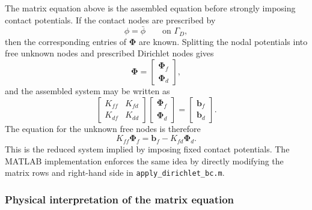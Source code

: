 \documentclass[11pt]{article}
\begin{document}
The matrix equation above is the assembled equation before strongly imposing contact potentials. If the contact nodes are prescribed by
\begin{equation}
\phi=\bar{\phi} \qquad \text{on } \Gamma_D,
\end{equation}
then the corresponding entries of $\bm{\Phi}$ are known. Splitting the nodal potentials into free unknown nodes and prescribed Dirichlet nodes gives
\begin{equation}
\bm{\Phi}
= \begin{bmatrix}
\bm{\Phi}_f \\
\bm{\Phi}_d
\end{bmatrix},
\end{equation}
and the assembled system may be written as
\begin{equation}
\begin{bmatrix}
K_{ff} & K_{fd} \\
K_{df} & K_{dd}
\end{bmatrix}
\begin{bmatrix}
\bm{\Phi}_f \\
\bm{\Phi}_d
\end{bmatrix}
=
\begin{bmatrix}
\bm{b}_f \\
\bm{b}_d
\end{bmatrix}.
\end{equation}
The equation for the unknown free nodes is therefore
\begin{equation}
\boxed{
K_{ff}\bm{\Phi}_f
= \bm{b}_f - K_{fd}\bm{\Phi}_d .
}
\label{eq:module2_dirichlet_reduced_system}
\end{equation}
This is the reduced system implied by imposing fixed contact potentials. The MATLAB implementation enforces the same idea by directly modifying the matrix rows and right-hand side in \texttt{apply\_dirichlet\_bc.m}.

\subsubsection{Physical interpretation of the matrix equation}
\end{document}
